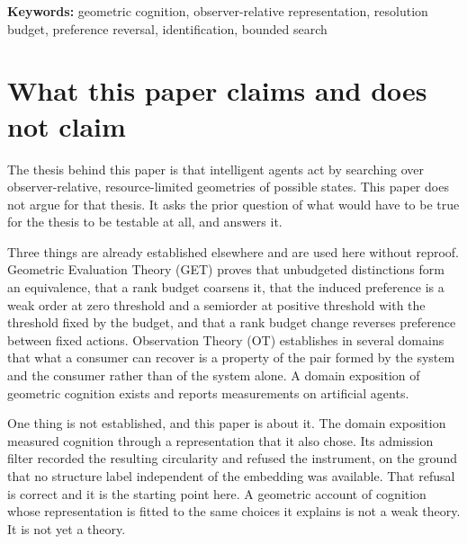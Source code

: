 \documentclass[11pt,letterpaper]{article}
\theoremstyle{plain}
\theoremstyle{definition}
\begin{document}
\begin{abstract}
budget, removing the evaluator's deliberation removes the instrument rather than
narrowing it, and a load the instrument does survive moved nothing we could
measure. None of the three included a check that the intervention reduced
effective rank, which is why we report them as an open question rather than as
evidence against the prediction. We restate the five
predictions of the programme as
consequences of those conditions, restate the seven falsifiers as conditions on
the record rather than on the author's judgment, and give a phased programme in
which each phase retires exactly one degree of freedom. The theory's own
epistemic status is that the evaluation layer is proved and measured on
artificial evaluators, the observer layer is measured in other domains, and the
cognitive synthesis is posited.
\end{abstract}

\vspace{0.6em}
\noindent\textbf{Keywords:} geometric cognition, observer-relative
representation, resolution budget, preference reversal, identification,
bounded search

\section{What this paper claims and does not claim}

The thesis behind this paper is that intelligent agents act by searching over
observer-relative, resource-limited geometries of possible states. This paper
does not argue for that thesis. It asks the prior question of what would have to
be true for the thesis to be testable at all, and answers it.

Three things are already established elsewhere and are used here without
reproof. Geometric Evaluation Theory (GET) proves that unbudgeted distinctions
form an equivalence, that a rank budget coarsens it, that the induced preference
is a weak order at zero threshold and a semiorder at positive threshold with the
threshold fixed by the budget, and that a rank budget change reverses preference
between fixed actions. Observation Theory (OT) establishes in several domains
that what a consumer can recover is a property of the pair formed by the system
and the consumer rather than of the system alone. A domain exposition of
geometric cognition exists and reports measurements on artificial agents.

One thing is not established, and this paper is about it. The domain exposition
measured cognition through a representation that it also chose. Its admission
filter recorded the resulting circularity and refused the instrument, on the
ground that no structure label independent of the embedding was available. That
refusal is correct and it is the starting point here. A geometric account of
cognition whose representation is fitted to the same choices it explains is not
a weak theory. It is not yet a theory.
\end{document}

